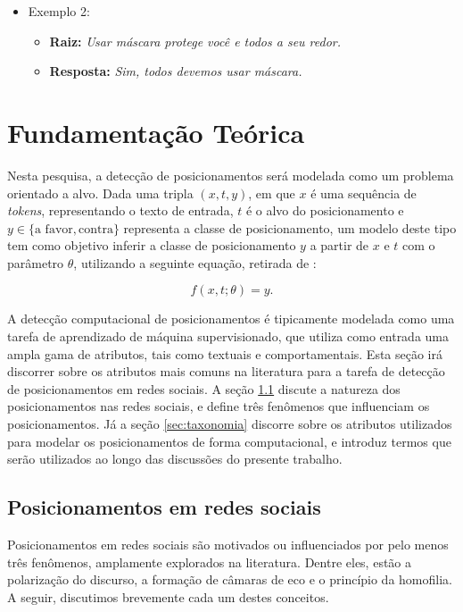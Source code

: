 \documentclass[
	12pt, oneside, a4paper, english, brazil
]{abntex2ppgsi}
\begin{document}
\begin{itemize}
    \item[] Exemplo 2:
    \begin{itemize}
        \item[] \textbf{Raiz:} \textit{Usar máscara protege você e todos a seu redor.}
        \item[] \textbf{Resposta:} \textit{Sim, todos devemos usar máscara.}
    \end{itemize}
\end{itemize}

\chapter{Fundamentação Teórica}
\label{sec:fundamentacao-teorica}

Nesta pesquisa, a detecção de posicionamentos será modelada como um problema orientado a alvo. Dada uma tripla $(x, t, y)$, em que $x$ é uma sequência de {\em tokens}, representando o texto de entrada, $t$ é o alvo do posicionamento e $y \in \{\text{a favor}, \text{contra}\}$ representa a classe de posicionamento, um modelo deste tipo tem como objetivo inferir a classe de posicionamento $y$ a partir de $x$ e $t$ com o parâmetro $\theta$, utilizando a seguinte equação, retirada de :

\begin{equation}
    f (x, t; \theta) = y.
\end{equation}

A detecção computacional de posicionamentos é tipicamente modelada como uma tarefa de aprendizado de máquina supervisionado, que utiliza como entrada uma ampla gama de atributos, tais como textuais e comportamentais. Esta seção irá discorrer sobre os atributos mais comuns na literatura para a tarefa de detecção de posicionamentos em redes sociais. A seção \ref{sec:definicoes} discute a natureza dos posicionamentos nas redes sociais, e define três fenômenos que influenciam os posicionamentos. Já a seção \ref{sec:taxonomia} discorre sobre os atributos utilizados para modelar os posicionamentos de forma computacional, e introduz termos que serão utilizados ao longo das discussões do presente trabalho.

\section{Posicionamentos em redes sociais}
\label{sec:definicoes}

Posicionamentos em redes sociais são motivados ou influenciados por pelo menos três fenômenos, amplamente explorados na literatura. Dentre eles, estão a polarização do discurso, a formação de câmaras de eco e o princípio da homofilia. A seguir, discutimos brevemente cada um destes conceitos.
\end{document}
